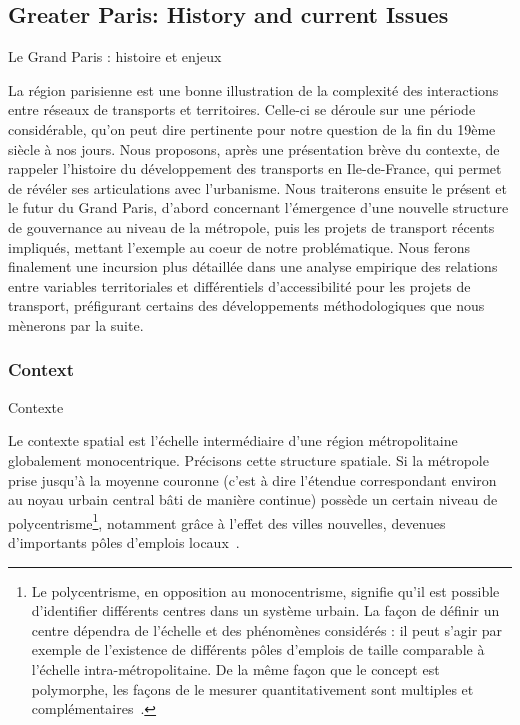 \subsection{Greater Paris: History and current Issues}{Le Grand Paris : histoire et enjeux}


La région parisienne est une bonne illustration de la complexité des interactions entre réseaux de transports et territoires. Celle-ci se déroule sur une période considérable, qu'on peut dire pertinente pour notre question de la fin du 19ème siècle à nos jours. Nous proposons, après une présentation brève du contexte, de rappeler l'histoire du développement des transports en Ile-de-France, qui permet de révéler ses articulations avec l'urbanisme. Nous traiterons ensuite le présent et le futur du Grand Paris, d'abord concernant l'émergence d'une nouvelle structure de gouvernance au niveau de la métropole, puis les projets de transport récents impliqués, mettant l'exemple au coeur de notre problématique. Nous ferons finalement une incursion plus détaillée dans une analyse empirique des relations entre variables territoriales et différentiels d'accessibilité pour les projets de transport, préfigurant certains des développements méthodologiques que nous mènerons par la suite.



\subsubsection{Context}{Contexte}

Le contexte spatial est l'échelle intermédiaire d'une région métropolitaine globalement monocentrique. Précisons cette structure spatiale. Si la métropole prise jusqu'à la moyenne couronne (c'est à dire l'étendue correspondant environ au noyau urbain central bâti de manière continue) possède un certain niveau de polycentrisme\footnote{Le polycentrisme, en opposition au monocentrisme, signifie qu'il est possible d'identifier différents centres dans un système urbain. La façon de définir un centre dépendra de l'échelle et des phénomènes considérés : il peut s'agir par exemple de l'existence de différents pôles d'emplois de taille comparable à l'échelle intra-métropolitaine. De la même façon que le concept est polymorphe, les façons de le mesurer quantitativement sont multiples et complémentaires~\cite{servais2004polycentrisme}.}, notamment grâce à l'effet des villes nouvelles, devenues d'importants pôles d'emplois locaux~\cite{berroir2005contribution}.



